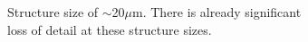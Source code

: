  \begin{figure}[!t]
     \centering
     \begin{subfigure}[t]{0.32\linewidth}
  	\centering
  	\caption{Structure size of $\sim$20$\mu$m. There is already significant loss of detail at these structure sizes.}
  	\label{fig:b2d36_q36}
 \end{subfigure}
\hfill
     \begin{subfigure}[t]{0.32\linewidth}

\end{subfigure}
\end{figure}
